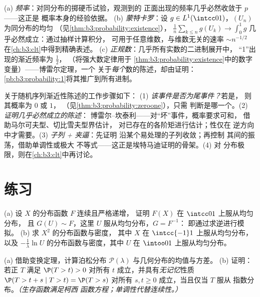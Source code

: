 \begin{example}[强大数定律能带来什么]
\label{ex:b3:probability:sllnapps}
(a) \emph{频率}：对同分布的掷硬币试验，观测到的
正面出现的频率几乎必然收敛于 $p$——这正是
概率本身的经验依据。
(b) \emph{蒙特卡罗}：设 $g \in
L^1(\intcc01)$，$(U_n)$ 为同分布的均匀
（见\cref{thm:b3:probability:existence}），
$\frac1n\sum_{k\leq n}g(U_k) \to \int_0^1g$ 几乎必然成立：通过抽样计算积分，
可用于任意维数，与维数无关的速率 $\sim n^{-1/2}$
在\cref{ch:b3:clt}中得到精确表述。
(c) \emph{正规数}：几乎所有实数的二进制展开中，
“1”出现的渐近频率为 $\frac12$，
（将强大数定律用于
\cref{thm:b3:probability:existence}中的数字变量）——博雷尔定理，一个
关于\emph{每个}数的陈述，却由证明：
\cref{pb:b3:probability:1}将其推广到所有进制。
\end{example}

\begin{method}\label{met:b3:probability:toolkit}
关于随机序列渐近性陈述的工作步骤如下：
(1) \emph{该事件是否为尾事件？}若是，
则其概率为 $0$ 或 $1$，
（见\cref{thm:b3:probability:zeroone}），只需
判断是哪一个。(2) \emph{证明几乎必然成立的陈述}：
博雷尔–坎泰利——对“坏”事件，概率要求可和，
借助马尔可夫型、切比雪夫型界估计，
对已存在的各阶矩进行估计；性仅在
逆方向中才需要。(3) \emph{子列 + 夹逼}：先证明
沿某个易处理的子列收敛；再控制
其间的振荡，借助单调性或极大
不等式——这正是埃特马迪证明的骨架。(4) 对
分布极限，则在\cref{ch:b3:clt}中再讨论。
\end{method}

\section{练习}

\begin{exercise}[$\star$]\label{exo:b3:probability:1}
(a) 设 $X$ 的分布函数 $F$ 连续且严格递增，
证明 $F(X)$ 在 $\intcc01$ 上服从均匀分布，
且 $G(U) \sim F$，这里 $U$ 服从均匀分布，$G = F^{-1}$：
即通过求逆进行模拟。
(b) 求 $X^2$ 的分布函数与密度，
其中 $X$ 在 $\intcc{-1}1$ 上服从均匀分布，以及 $-\frac1\lambda\ln
U$ 的分布函数与密度，其中 $U$ 在 $\intoo01$ 上服从均匀分布。
\end{exercise}

\begin{exercise}[$\star$]\label{exo:b3:probability:2}
(a) 借助变换定理，计算泊松分布 $\mathcal
P(\lambda)$ 与几何分布的均值与方差。
(b) 证明：若正 $T$ 满足 $\P(T > t)
> 0$ 对所有 $t$ 成立，并具有\emph{无记忆}性质 $\P(T > t + s \mid
T > t) = \P(T > s)$ 对所有 $s, t \geq 0$ 成立，当且仅当 $T$ 服从
指数分布。\emph{（生存函数满足柯西
函数方程；单调性代替连续性。）}
\end{exercise}

